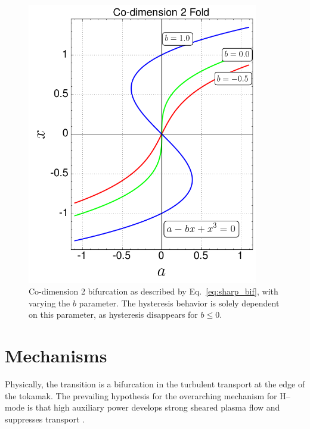 \begin{figure}[tb] %
\begin{minipage}{0.49\linewidth}
	\centering
	\includegraphics[width=0.9\textwidth]{../Graphics/Bif_Graphs/co-2_fold_b_var.png}
\end{minipage}
\hfill
\begin{minipage}{0.49\linewidth}
	\caption{Co-dimension 2 bifurcation as described by Eq.~\ref{eq:sharp_bif}, with varying the $b$ parameter. The hysteresis behavior is solely dependent on this parameter, as hysteresis disappears for $b \leq 0$.}
	\label{fig:hysteresis_b_var}
\end{minipage}
\end{figure}

\section{Mechanisms}\label{sec:mechanics}
Physically, the transition is a bifurcation in the turbulent transport at the edge of the tokamak.
The prevailing hypothesis for the overarching mechanism for H--mode is that high auxiliary power develops strong sheared plasma flow and suppresses transport \cite{freidberg_plasma_2007}.

